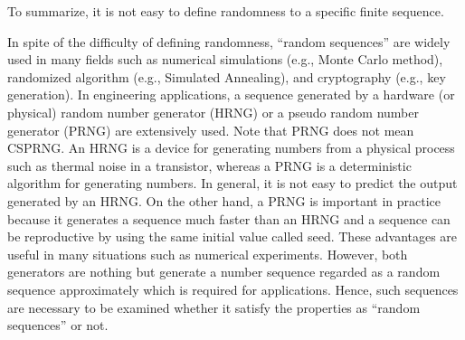 To summarize, it is not easy to define randomness to a specific finite sequence.
%
\par
In spite of the difficulty of defining randomness, ``random sequences'' are widely used in many fields such as numerical simulations (e.g., Monte Carlo method), randomized algorithm (e.g., Simulated Annealing), and cryptography (e.g., key generation). 
In engineering applications, a sequence generated by a hardware (or physical) random number generator (HRNG) or a pseudo random number generator (PRNG) are extensively used.
%
Note that PRNG does not mean CSPRNG. 
An HRNG is a device for generating numbers from a physical process such as thermal noise in a transistor, whereas a PRNG is a deterministic algorithm for generating numbers.
%
In general, it is not easy to predict the output generated by an HRNG. On the other hand, a PRNG is important in practice because it generates a sequence much faster than an HRNG and a sequence can be reproductive by using the same initial value called seed. These advantages are useful in many situations such as numerical experiments.
%
However, both generators are nothing but generate a number sequence regarded as a random sequence approximately which is required for applications.
Hence, such sequences are necessary to be examined whether it satisfy the properties as ``random sequences'' or not.